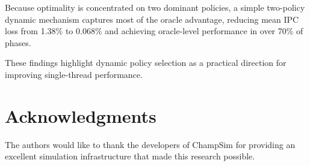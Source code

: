 \documentclass[conference]{IEEEtran}
\begin{document}
Because optimality is concentrated on two dominant policies,
a simple two-policy dynamic mechanism captures most of the
oracle advantage, reducing mean IPC loss from 1.38\% to 0.068\%
and achieving oracle-level performance in over 70\% of phases.

These findings highlight dynamic policy selection as a practical
direction for improving single-thread performance.

\section*{Acknowledgments}

The authors would like to thank the developers of ChampSim for providing an excellent simulation infrastructure that made this research possible.



\end{document}
